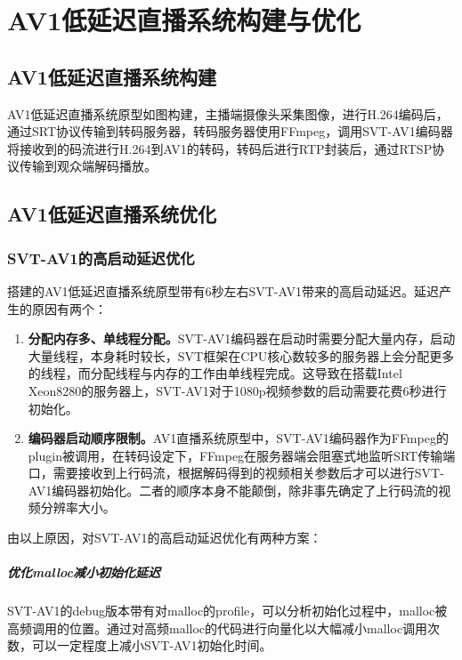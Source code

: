 \chapter{AV1低延迟直播系统构建与优化}

\section{AV1低延迟直播系统构建}

  AV1低延迟直播系统原型如图构建，主播端摄像头采集图像，进行H.264编码后，通过SRT协议传输到转码服务器，转码服务器使用FFmpeg，调用SVT-AV1编码器将接收到的码流进行H.264到AV1的转码，转码后进行RTP封装后，通过RTSP协议传输到观众端解码播放。


\section{AV1低延迟直播系统优化}

\subsection{SVT-AV1的高启动延迟优化}
  搭建的AV1低延迟直播系统原型带有6秒左右SVT-AV1带来的高启动延迟。延迟产生的原因有两个：

  \begin{enumerate} [label=\arabic*)]
    \item \textbf{分配内存多、单线程分配。}SVT-AV1编码器在启动时需要分配大量内存，启动大量线程，本身耗时较长，SVT框架在CPU核心数较多的服务器上会分配更多的线程，而分配线程与内存的工作由单线程完成。这导致在搭载Intel Xeon8280的服务器上，SVT-AV1对于1080p视频参数的启动需要花费6秒进行初始化。
    \item \textbf{编码器启动顺序限制。}AV1直播系统原型中，SVT-AV1编码器作为FFmpeg的plugin被调用，在转码设定下，FFmpeg在服务器端会阻塞式地监听SRT传输端口，需要接收到上行码流，根据解码得到的视频相关参数后才可以进行SVT-AV1编码器初始化。二者的顺序本身不能颠倒，除非事先确定了上行码流的视频分辨率大小。
  \end{enumerate}

  由以上原因，对SVT-AV1的高启动延迟优化有两种方案：

  \paragraph{优化malloc减小初始化延迟} SVT-AV1的debug版本带有对malloc的profile，可以分析初始化过程中，malloc被高频调用的位置。通过对高频malloc的代码进行向量化以大幅减小malloc调用次数，可以一定程度上减小SVT-AV1初始化时间。

